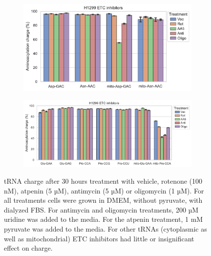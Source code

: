 \begin{figure}[!ht]
     \centering
     \begin{subfigure}[b]{0.6\textwidth}
         \includegraphics[width=\textwidth]{figures/sapp/tRNA/H1299_ETCinhib_Asp-Asn.pdf}
     \end{subfigure}
     \begin{subfigure}[b]{0.8\textwidth}
         \vspace{5pt}
         \includegraphics[width=\textwidth]{figures/sapp/tRNA/H1299_ETCinhib_Glu-Pro.pdf}
     \end{subfigure}
     \hfill
        \caption[ETC inhibitor in H1299, effect on tRNA charge]{
        tRNA charge after 30 hours treatment with vehicle, rotenone (100 nM), atpenin (5 µM), antimycin (5 µM) or oligomycin (1 µM).
        For all treatments cells were grown in DMEM, without pyruvate, with dialyzed FBS.
        For antimycin and oligomycin treatments, 200 µM uridine was added to the media.
        For the atpenin treatment, 1 mM pyruvate was added to the media.
        For other tRNAs (cytoplasmic as well as mitochondrial) ETC inhibitors had little or insignificant effect on charge.
        }
        \label{fig:sapp:tRNA:H1299_ETCinhib}
\end{figure}












